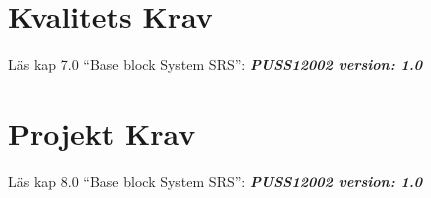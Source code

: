 \documentclass[paper=a4, fontsize=11pt,twoside]{article}
\begin{document}
\section{Kvalitets Krav}
Läs kap 7.0  “Base block System SRS”:   \textbf{\textit{PUSS12002 version: 1.0}} 
\section{Projekt Krav}
Läs kap 8.0  “Base block System SRS”:   \textbf{\textit{PUSS12002 version: 1.0}} 
\end{document}
